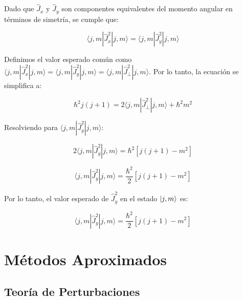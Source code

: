 Dado que $\hat{J}_x$ y $\hat{J}_y$ son componentes equivalentes del momento angular en términos de simetría, se cumple que:

\begin{equation}
\langle j, m | \hat{J}_x^2 | j, m \rangle = \langle j, m | \hat{J}_y^2 | j, m \rangle
\end{equation}

Definimos el valor esperado común como $\langle j, m | \hat{J}_x^2 | j, m \rangle = \langle j, m | \hat{J}_y^2 | j, m \rangle = \langle j, m | \hat{J}_\perp^2 | j, m \rangle$. Por lo tanto, la ecuación se simplifica a:

\begin{equation}
\hbar^2 j(j+1) = 2 \langle j, m | \hat{J}_\perp^2 | j, m \rangle + \hbar^2 m^2
\end{equation}

Resolviendo para $\langle j, m | \hat{J}_y^2 | j, m \rangle$:

\begin{equation}
2 \langle j, m | \hat{J}_y^2 | j, m \rangle = \hbar^2 \left[ j(j+1) - m^2 \right]
\end{equation}

\begin{equation}
\langle j, m | \hat{J}_y^2 | j, m \rangle = \frac{\hbar^2}{2} \left[ j(j+1) - m^2 \right]
\end{equation}

Por lo tanto, el valor esperado de $\hat{J}_y^2$ en el estado $\ket{j, m}$ es:

\begin{equation}
\langle j, m | \hat{J}_y^2 | j, m \rangle = \frac{\hbar^2}{2} \left[ j(j+1) - m^2 \right]
\end{equation}











\chapter{Métodos Aproximados}

\section{Teoría de Perturbaciones}

